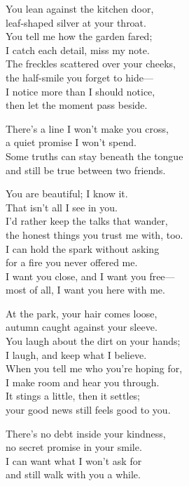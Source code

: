 \begin{lyrics}
You lean against the kitchen door,\\
leaf-shaped silver at your throat.\\
You tell me how the garden fared;\\
I catch each detail, miss my note.\\
The freckles scattered over your cheeks,\\
the half-smile you forget to hide—\\
I notice more than I should notice,\\
then let the moment pass beside.

There’s a line I won’t make you cross,\\
a quiet promise I won’t spend.\\
Some truths can stay beneath the tongue\\
and still be true between two friends.

You are beautiful; I know it.\\
That isn’t all I see in you.\\
I’d rather keep the talks that wander,\\
the honest things you trust me with, too.\\
I can hold the spark without asking\\
for a fire you never offered me.\\
I want you close, and I want you free—\\
most of all, I want you here with me.

At the park, your hair comes loose,\\
autumn caught against your sleeve.\\
You laugh about the dirt on your hands;\\
I laugh, and keep what I believe.\\
When you tell me who you’re hoping for,\\
I make room and hear you through.\\
It stings a little, then it settles;\\
your good news still feels good to you.

There’s no debt inside your kindness,\\
no secret promise in your smile.\\
I can want what I won’t ask for\\
and still walk with you a while.


\end{lyrics}
